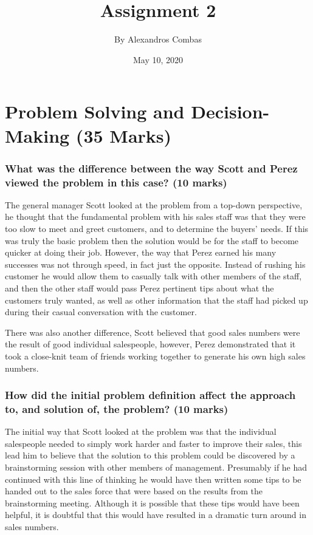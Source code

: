 \documentclass[letterpaper,12pt,titlepage]{article}
\title{\Large{\textbf{Assignment 2}}}
\author{By Alexandros Combas}
\date{May 10, 2020}
\begin{document}
\maketitle

\renewcommand\thepart{\Alph{part}}
\part{Problem Solving and Decision-Making (35 Marks)}

\section{What was the difference between the way Scott and Perez viewed the problem in this case? (10 marks)}
	
The general manager Scott looked at the problem from a top-down perspective, he thought that the fundamental problem with his sales staff was that they were too slow to meet and greet customers, and to determine the buyers' needs. If this was truly the basic problem then the solution would be for the staff to become quicker at doing their job. However, the way that Perez earned his many successes was not through speed, in fact just the opposite. Instead of rushing his customer he would allow them to casually talk with other members of the staff, and then the other staff would pass Perez pertinent tips about what the customers truly wanted, as well as other information that the staff had picked up during their casual conversation with the customer.

There was also another difference, Scott believed that good sales
numbers were the result of good individual salespeople, however, Perez demonstrated that it took a close-knit team of friends working together to generate his own high sales numbers.

\section{How did the initial problem definition affect the approach to, and solution of, the problem? (10 marks)}

The initial way that Scott looked at the problem was that the individual salespeople needed to simply work harder and faster to improve their sales, this lead him to believe that the solution to this problem could be discovered by a brainstorming session with other members of management. Presumably if he had continued with this line of thinking he would have then written some tips to be handed out to the sales force that were based on the results from the brainstorming meeting. Although it is possible that these tips would have been helpful, it is doubtful that this would have resulted in a dramatic turn around in sales numbers.
\end{document}
